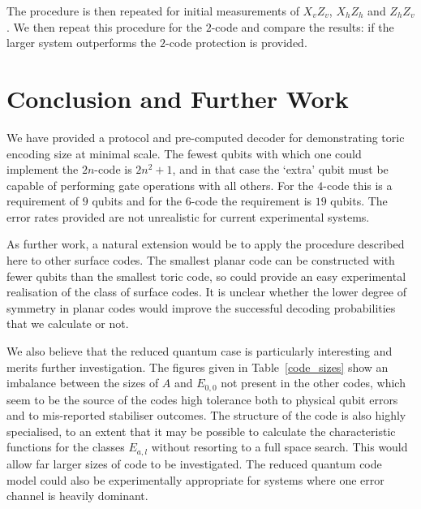 The procedure is then repeated for initial measurements of $X_vZ_v$, $X_hZ_h$ and $Z_hZ_v$. We then repeat this procedure for the $2$-code and compare the results: if the larger system outperforms the $2$-code protection is provided. 


\section{Conclusion and Further Work}

We have provided a protocol and pre-computed decoder for demonstrating toric encoding size at minimal scale. The fewest qubits with which one could implement the $2n$-code is $2n^2+1$, and in that case the `extra' qubit must be capable of performing gate operations with all others. For the $4$-code this is a requirement of $9$ qubits and for the $6$-code the requirement is $19$ qubits. The error rates provided are not unrealistic for current experimental systems. 

As further work, a natural extension would be to apply the procedure described here to other surface codes. The smallest planar code can be constructed with fewer qubits than the smallest toric code, so could provide an easy experimental realisation of the class of surface codes. It is unclear whether the lower degree of symmetry in planar codes would improve the successful decoding probabilities that we calculate or not. 

We also believe that the reduced quantum case is particularly interesting and merits further investigation. The figures given in Table~\ref{code_sizes} show an imbalance between the sizes of $A$ and $E_{0,0}$ not present in the other codes, which seem to be the source of the codes high tolerance both to physical qubit errors and to mis-reported stabiliser outcomes. The structure of the code is also highly specialised, to an extent that it may be possible to calculate the characteristic functions for the classes $E_{a,l}$ without resorting to a full space search. This would allow far larger sizes of code to be investigated. The reduced quantum code model could also be experimentally appropriate for systems where one error channel is heavily dominant.


